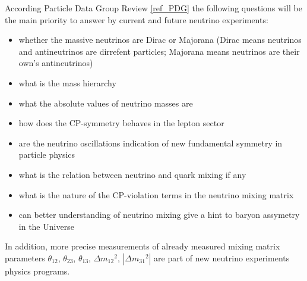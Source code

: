 According Particle Data Group Review \ref{ref_PDG} the following questions will be the main priority to answer by current and future neutrino experiments:
\begin{itemize}
  \item whether the massive neutrinos are Dirac or Majorana (Dirac means neutrinos and antineutrinos are dirrefent particles; Majorana means neutrinos are their own's antineutrinos)
  \item what is the mass hierarchy
  \item what the absolute values of neutrino masses are
  \item how does the CP-symmetry behaves in the lepton sector
  \item are the neutrino oscillations indication of new fundamental symmetry in particle physics
  \item what is the relation between neutrino and quark mixing if any
  \item what is the nature of the CP-violation terms in the neutrino mixing matrix
  \item can better understanding of neutrino mixing give a hint to baryon assymetry in the Universe 
\end{itemize} 
In addition, more precise measurements of already measured mixing matrix parameters $\theta_{12}$, $\theta_{23}$, $\theta_{13}$, $\Delta{m_{12}}^2$, $|\Delta{m_{31}}^2|$ are part of new neutrino experiments physics programs.
